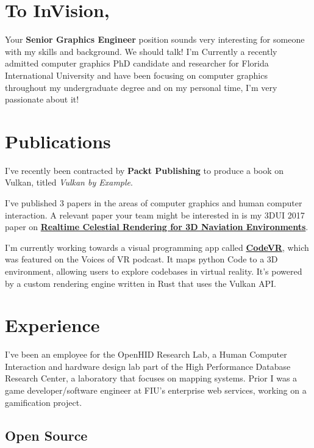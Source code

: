 \documentclass[10pt,a4paper]{article}
\begin{document}
\begin{multicols}{2}

\section*{To InVision,}

Your \textbf{Senior Graphics Engineer} position sounds very interesting for someone with my skills and background. We should talk! I'm Currently a recently admitted computer graphics PhD candidate and researcher for Florida International University and have been focusing on computer graphics throughout my undergraduate degree and on my personal time, I'm very passionate about it!

\vspace{-1.3em}

\section*{Publications}

I've recently been contracted by \textbf{Packt Publishing} to produce a book on Vulkan, titled \textit{Vulkan by Example}.

I've published 3 papers in the areas of computer graphics and human computer interaction. A relevant paper your team might be interested in is my 3DUI 2017 paper on \href{https://alain.xyz/research/realtime-celestial-rendering}{\textbf{Realtime Celestial Rendering for 3D Naviation Environments}}. 

I'm currently working towards a visual programming app called \href{https://github.com/OpenHID/code-vr}{\textbf{CodeVR}}, which was featured on the Voices of VR podcast. It maps python Code to a 3D environment, allowing users to explore codebases in virtual reality. It's powered by a custom rendering engine written in Rust that uses the Vulkan API.


\section*{Experience}

I've been an employee for the OpenHID Research Lab, a Human Computer Interaction and hardware design lab part of the High Performance Database Research Center, a laboratory that focuses on mapping systems. Prior I was a game developer/software engineer at FIU's enterprise web services, working on a gamification project.

\subsection*{Open Source}


\end{multicols}
\end{document}
